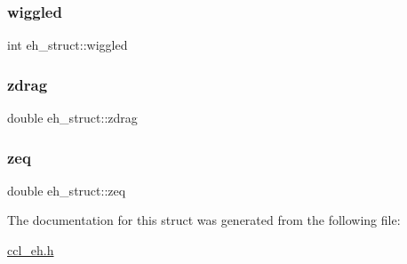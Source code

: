 \subsubsection{\texorpdfstring{wiggled}{wiggled}}
{\footnotesize\ttfamily int eh\+\_\+struct\+::wiggled}

\mbox{\label{structeh__struct_af3d1d22e42cdf316b3572a9149d98596}} 
\subsubsection{\texorpdfstring{zdrag}{zdrag}}
{\footnotesize\ttfamily double eh\+\_\+struct\+::zdrag}

\mbox{\label{structeh__struct_a115be04402be00203663cbf0cdeb6ccc}} 
\subsubsection{\texorpdfstring{zeq}{zeq}}
{\footnotesize\ttfamily double eh\+\_\+struct\+::zeq}



The documentation for this struct was generated from the following file\+:\begin{DoxyCompactItemize}
\item 
\mbox{\hyperlink{ccl__eh_8h}{ccl\+\_\+eh.\+h}}\end{DoxyCompactItemize}
